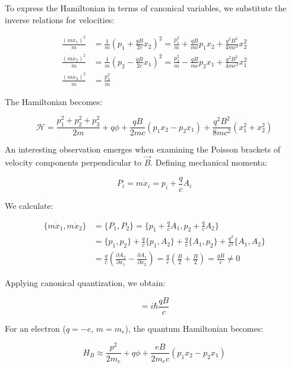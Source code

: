 \documentclass[10pt]{article}
\begin{document}
To express the Hamiltonian in terms of canonical variables, we substitute the inverse relations for velocities:

\begin{align*}
\frac{(m\dot{x}_{1})^{2}}{m} &= \frac{1}{m}(p_{1}+\frac{q B}{2 c} x_{2})^{2}=\frac{p_{1}^{2}}{m}+\frac{q B}{m c} p_{1}x_{2}+\frac{q^{2}B^{2}}{4mc^{2}}x_{2}^{2} \\
\frac{(m\dot{x}_{2})^{2}}{m} &= \frac{1}{m}(p_{2}-\frac{q B}{2 c} x_{1})^{2}=\frac{p_{2}^{2}}{m}-\frac{q B}{m c}p_{2}x_{1}+\frac{q^{2}B^{2}}{4mc^{2}}x_{1}^{2}  \tag{12.9}\\
\frac{(m\dot{x}_{3})^{2}}{m} &= \frac{p_{3}^{2}}{m}
\end{align*}

The Hamiltonian becomes:

\begin{equation*}
\mathcal{H}=\frac{p_{1}^{2}+p_{2}^{2}+p_{3}^{2}}{2m}+q\phi+\frac{qB}{2mc}(p_{1}x_{2}-p_{2}x_{1})+\frac{q^{2}B^{2}}{8mc^{2}}(x_{1}^{2}+x_{2}^{2}) \tag{12.10}
\end{equation*}

An interesting observation emerges when examining the Poisson brackets of velocity components perpendicular to $\vec{B}$. Defining mechanical momenta:

\begin{equation*}
P_{i}=m\dot{x}_{i}=p_{i}+\frac{q}{c}A_{i} \tag{12.11}
\end{equation*}

We calculate:

\begin{align*}
\{m\dot{x}_{1},m\dot{x}_{2}\} &= \{P_{1},P_{2}\}=\{p_{1}+\frac{q}{c}A_{1},p_{2}+\frac{q}{c}A_{2}\}\\
&= \{p_{1},p_{2}\}+\frac{q}{c}\{p_{1},A_{2}\}+\frac{q}{c}\{A_{1},p_{2}\}+\frac{q^{2}}{c^{2}}\{A_{1},A_{2}\}\\
&= \frac{q}{c}(\frac{\partial A_{2}}{\partial x_{1}}-\frac{\partial A_{1}}{\partial x_{2}})=\frac{q}{c}(\frac{B}{2}+\frac{B}{2})=\frac{qB}{c}\neq 0 \tag{12.12}
\end{align*}

Applying canonical quantization, we obtain:

\begin{equation*}
[P_{1},P_{2}]=i\hbar\frac{qB}{c} \tag{12.13}
\end{equation*}

For an electron ($q=-e$, $m=m_e$), the quantum Hamiltonian becomes:

\begin{equation*}
H_{B}\approx\frac{p^{2}}{2m_e}+q\phi+\frac{eB}{2m_e c}(p_{1}x_{2}-p_{2}x_{1}) \tag{12.14}
\end{equation*}
\end{document}
